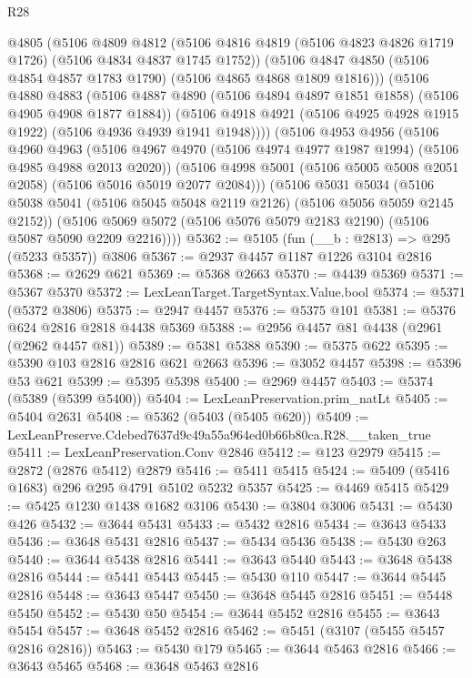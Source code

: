 \begin{lexlean}{R28}
\begin{coremodule}
      @4805
      (@5106
        @4809
        @4812
        (@5106 @4816 @4819 (@5106 @4823 @4826 @1719 @1726) (@5106 @4834 @4837 @1745 @1752))
        (@5106 @4847 @4850 (@5106 @4854 @4857 @1783 @1790) (@5106 @4865 @4868 @1809 @1816)))
      (@5106
        @4880
        @4883
        (@5106 @4887 @4890 (@5106 @4894 @4897 @1851 @1858) (@5106 @4905 @4908 @1877 @1884))
        (@5106 @4918 @4921 (@5106 @4925 @4928 @1915 @1922) (@5106 @4936 @4939 @1941 @1948))))
    (@5106
      @4953
      @4956
      (@5106
        @4960
        @4963
        (@5106 @4967 @4970 (@5106 @4974 @4977 @1987 @1994) (@5106 @4985 @4988 @2013 @2020))
        (@5106 @4998 @5001 (@5106 @5005 @5008 @2051 @2058) (@5106 @5016 @5019 @2077 @2084)))
      (@5106
        @5031
        @5034
        (@5106 @5038 @5041 (@5106 @5045 @5048 @2119 @2126) (@5106 @5056 @5059 @2145 @2152))
        (@5106 @5069 @5072 (@5106 @5076 @5079 @2183 @2190) (@5106 @5087 @5090 @2209 @2216))))
@5362 := @5105 (fun (__b : @2813) => @295 (@5233 @5357)) @3806
@5367 := @2937 @4457 @1187 @1226 @3104 @2816
@5368 := @2629 @621
@5369 := @5368 @2663
@5370 := @4439 @5369
@5371 := @5367 @5370
@5372 := LexLeanTarget.TargetSyntax.Value.bool
@5374 := @5371 (@5372 @3806)
@5375 := @2947 @4457
@5376 := @5375 @101
@5381 := @5376 @624 @2816 @2818 @4438 @5369
@5388 := @2956 @4457 @81 @4438 (@2961 (@2962 @4457 @81))
@5389 := @5381 @5388
@5390 := @5375 @622
@5395 := @5390 @103 @2816 @2816 @621 @2663
@5396 := @3052 @4457
@5398 := @5396 @53 @621
@5399 := @5395 @5398
@5400 := @2969 @4457
@5403 := @5374 (@5389 (@5399 @5400))
@5404 := LexLeanPreservation.prim_natLt
@5405 := @5404 @2631
@5408 := @5362 (@5403 (@5405 @620))
@5409 := LexLeanPreserve.Cdebed7637d9c49a55a964ed0b66b80ca.R28.__taken_true
@5411 := LexLeanPreservation.Conv @2846
@5412 := @123 @2979
@5415 := @2872 (@2876 @5412) @2879
@5416 := @5411 @5415
@5424 := @5409 (@5416 @1683) @296 @295 @4791 @5102 @5232 @5357
@5425 := @4469 @5415
@5429 := @5425 @1230 @1438 @1682 @3106
@5430 := @3804 @3006
@5431 := @5430 @426
@5432 := @3644 @5431
@5433 := @5432 @2816
@5434 := @3643 @5433
@5436 := @3648 @5431 @2816
@5437 := @5434 @5436
@5438 := @5430 @263
@5440 := @3644 @5438 @2816
@5441 := @3643 @5440
@5443 := @3648 @5438 @2816
@5444 := @5441 @5443
@5445 := @5430 @110
@5447 := @3644 @5445 @2816
@5448 := @3643 @5447
@5450 := @3648 @5445 @2816
@5451 := @5448 @5450
@5452 := @5430 @50
@5454 := @3644 @5452 @2816
@5455 := @3643 @5454
@5457 := @3648 @5452 @2816
@5462 := @5451 (@3107 (@5455 @5457 @2816 @2816))
@5463 := @5430 @179
@5465 := @3644 @5463 @2816
@5466 := @3643 @5465
@5468 := @3648 @5463 @2816

\end{coremodule}
\end{lexlean}
